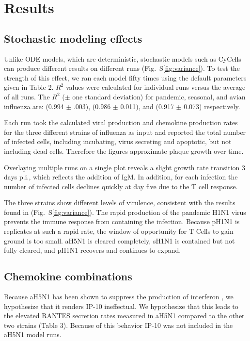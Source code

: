 \documentclass[10pt]{article}
\begin{document}
\section{Results}

\subsection{Stochastic modeling effects}

Unlike ODE models, which are deterministic, stochastic models such as CyCells can produce different results on different runs (Fig.~S\ref{fig:variance}).  To test the strength of this effect, we ran each model fifty times using the default parameters given in Table 2.  $R^2$ values were calculated for individual runs versus the average of all runs.  The $R^2$ ($\pm$ one standard deviation) for pandemic, seasonal, and avian influenza are: (0.994 $\pm$ .003), (0.986 $\pm$ 0.011), and (0.917 $\pm$ 0.073) respectively.

Each run took the calculated viral production and chemokine production rates for the three different strains of influenza as input and reported the total number of infected cells, including incubating, virus secreting and apoptotic, but not including dead cells.  Therefore the figures approximate plaque growth over time.

Overlaying multiple runs on a single plot reveals a slight growth rate transition 3 days p.i., which reflects the addition of IgM.  In addition, for each infection the number of infected cells declines quickly at day five due to the T cell response. 

The three strains show different levels of virulence, consistent with the results found in \cite{Mitchell2011} (Fig.~S\ref{fig:variance}).  The rapid production of the pandemic H1N1 virus prevents the immune response from containing the infection.  Because pH1N1 is replicates at such a rapid rate, the window of opportunity for T Cells to gain ground is too small.  aH5N1 is cleared completely, sH1N1 is contained but not fully cleared, and pH1N1 recovers and continues to expand.



\subsection{Chemokine combinations}

Because aH5N1 has been shown to suppress the production of interferon \cite{Mitchell2011}, we hypothesize that it renders IP-10 ineffectual.  We hypothesize that this leads to the elevated RANTES secretion rates measured in aH5N1 compared to the other two strains (Table 3).  Because of this behavior IP-10 was not included in the aH5N1 model runs. 
\end{document}
